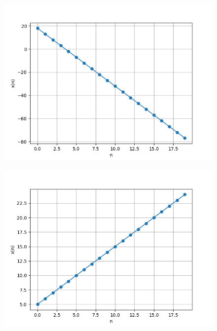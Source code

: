 \documentclass[journal,12pt,twocolumn]{IEEEtran}
\theoremstyle{remark}
\begin{document}
\begin{figure}[h]
      \centering
       \includegraphics[width=1\linewidth]{figs/download (1).png} %
        \caption{}
    \end{figure}
    
\begin{figure}[h]
      \centering
       \includegraphics[width=1\linewidth]{figs/download (2).png} %
        \caption{}
    \end{figure}
    
\end{document}
